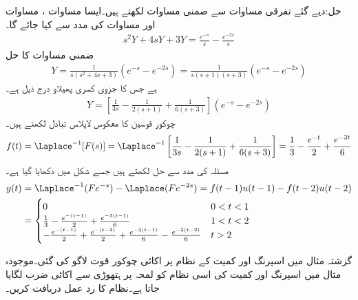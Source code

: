 حل:دیے گئے تفرقی مساوات سے ضمنی مساوات لکھتے ہیں۔ایسا مساوات ، مساوات  اور مساوات  کی مدد سے کیا جائے گا۔
\begin{align*}
s^2Y+4sY+3Y=\frac{e^{-s}}{s}-\frac{e^{-2s}}{s}
\end{align*}
ضمنی مساوات کا حل
\begin{align*}
Y=\frac{1}{s(s^2+4s+3)}(e^{-s}-e^{-2s})=\frac{1}{s(s+1)(s+3)}(e^{-s}-e^{-2s})
\end{align*}
ہے جس کا جزوی کسری پھیلاو درج ذیل ہے۔
\begin{align*}
Y=\left[\frac{1}{3s}-\frac{1}{2(s+1)}+\frac{1}{6(s+3)}\right](e^{-s}-e^{-2s})
\end{align*} 
چوکور قوسین کا معکوس لاپلاس تبادل لکھتے ہیں۔
\begin{align*}
f(t)=\Laplace^{-1} [F(s)]=\Laplace^{-1}\left[\frac{1}{3s}-\frac{1}{2(s+1)}+\frac{1}{6(s+3)}\right]=\frac{1}{3}-\frac{e^{-t}}{2}+\frac{e^{-3t}}{6}
\end{align*}
مسئلہ  کی مدد سے حل   لکھتے ہیں جسے شکل  میں دکھایا گیا ہے۔
\begin{align*}
y(t)&=\Laplace^{-1}(Fe^{-s})-\Laplace(Fe^{-2s})=f(t-1)u(t-1)-f(t-2)u(t-2)\\
&=
\begin{cases}
0&0< t<1\\
\frac{1}{3}-\frac{e^{-(t-1)}}{2}+\frac{e^{-3(t-1)}}{6} & 1<t<2\\
-\frac{e^{-(t-1)}}{2}+\frac{e^{-(t-2)}}{2}+\frac{e^{-3(t-1)}}{6}-\frac{e^{-3(t-2)}}{6} & t>2
\end{cases}
\end{align*}
 
گزشتہ مثال میں اسپرنگ اور کمیت کے نظام پر اکائی چوکور قوت لاگو کی گئی۔موجودہ مثال میں اسپرنگ اور کمیت کی اسی نظام کو لمحہ  پر ہتھوڑی سے اکائی ضرب لگایا جاتا ہے۔نظام کا رد عمل دریافت کریں۔  


